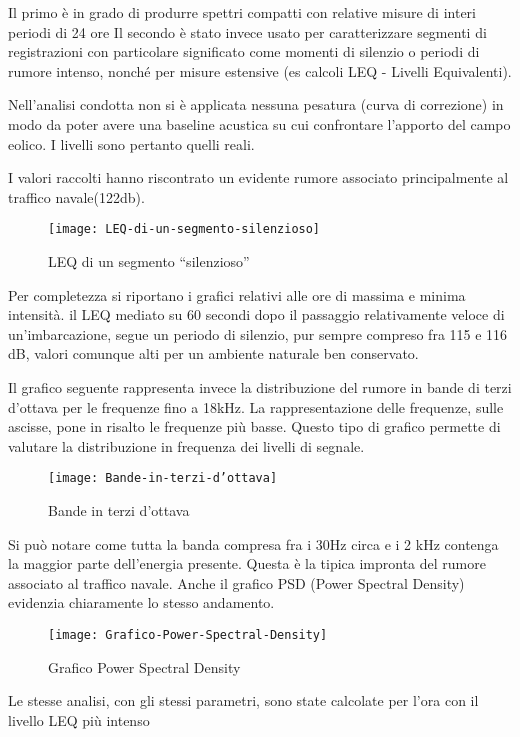 Il primo è in grado di produrre spettri compatti con relative misure di interi periodi di 24 ore
Il secondo è stato invece usato per caratterizzare segmenti di registrazioni con particolare significato come momenti di silenzio o periodi di rumore intenso, nonché per misure estensive (es calcoli LEQ - Livelli Equivalenti).

Nell’analisi condotta non si è applicata nessuna pesatura (curva di correzione) in modo da poter avere una baseline acustica su cui confrontare l’apporto del campo eolico. 
I livelli sono pertanto quelli reali.

I valori raccolti hanno riscontrato un evidente rumore associato principalmente al traffico navale(122db). 
\begin{figure}[h]
\centering
\texttt{[image: LEQ-di-un-segmento-silenzioso]}
\caption{LEQ di un segmento “silenzioso”}
\end{figure}

Per completezza si riportano i grafici relativi alle ore di massima e minima intensità. 
il LEQ mediato su 60 secondi dopo il passaggio relativamente veloce di un’imbarcazione, segue un periodo di silenzio, pur sempre compreso fra 115 e 116 dB, valori comunque alti per un ambiente naturale ben conservato.

Il grafico seguente rappresenta invece la distribuzione del rumore in bande di terzi d’ottava per le frequenze fino a 18kHz. 
La rappresentazione delle frequenze, sulle ascisse, pone in risalto le frequenze più basse. 
Questo tipo di grafico permette di valutare la distribuzione in frequenza dei livelli di segnale.

\begin{figure}[h]
\centering
\texttt{[image: Bande-in-terzi-d'ottava]}
\caption{Bande in terzi d’ottava}
\end{figure}

Si può notare come tutta la banda compresa fra i 30Hz circa e i 2 kHz contenga la maggior parte dell’energia presente. 
Questa è la tipica impronta del rumore associato al traffico navale. 
Anche il grafico PSD (Power Spectral Density) evidenzia chiaramente lo stesso andamento.

\begin{figure}[h]
\centering
\texttt{[image: Grafico-Power-Spectral-Density]}
\caption{Grafico Power Spectral Density}
\end{figure}

Le stesse analisi, con gli stessi parametri, sono state calcolate per l’ora con il livello LEQ più intenso 

